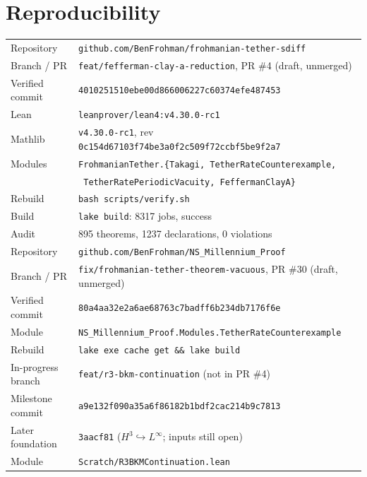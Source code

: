 \documentclass[11pt,a4paper]{article}
\theoremstyle{definition}
\theoremstyle{remark}
\newcommand{\NSMPPR}{\#30}
\newcommand{\NSMPCOMMIT}{80a4aa32e2a6ae68763c7badff6b234db7176f6e}
\newcommand{\lean}[1]{\texttt{#1}}
\begin{document}
\section{Reproducibility}\label{sec:repro}

\begin{center}\small
\begin{tabular}{@{}ll@{}}
\toprule
Repository & \lean{github.com/BenFrohman/frohmanian-tether-sdiff} \\
Branch / PR & \lean{feat/fefferman-clay-a-reduction}, PR \#4 (draft, unmerged) \\
Verified commit & \lean{4010251510ebe00d866006227c60374efe487453} \\
Lean & \lean{leanprover/lean4:v4.30.0-rc1} \\
Mathlib & \lean{v4.30.0-rc1}, rev \lean{0c154d67103f74be3a0f2c509f72ccbf5be9f2a7} \\
Modules & \lean{FrohmanianTether.\{Takagi, TetherRateCounterexample,} \\
 & \lean{\ TetherRatePeriodicVacuity, FeffermanClayA\}} \\
Rebuild & \lean{bash scripts/verify.sh} \\
Build & \lean{lake build}: 8317 jobs, success \\
Audit & 895 theorems, 1237 declarations, 0 violations \\
\midrule
Repository & \lean{github.com/BenFrohman/NS\_Millennium\_Proof} \\
Branch / PR & \lean{fix/frohmanian-tether-theorem-vacuous}, PR \NSMPPR{} (draft, unmerged) \\
Verified commit & \lean{\NSMPCOMMIT} \\
Module & \lean{NS\_Millennium\_Proof.Modules.TetherRateCounterexample} \\
Rebuild & \lean{lake exe cache get \&\& lake build} \\
\midrule
In-progress branch & \lean{feat/r3-bkm-continuation} (not in PR \#4) \\
Milestone commit & \lean{a9e132f090a35a6f86182b1bdf2cac214b9c7813} \\
Later foundation & \lean{3aacf81} ($H^3\hookrightarrow L^\infty$; inputs still open) \\
Module & \lean{Scratch/R3BKMContinuation.lean} \\
\bottomrule
\end{tabular}
\end{center}
\end{document}
